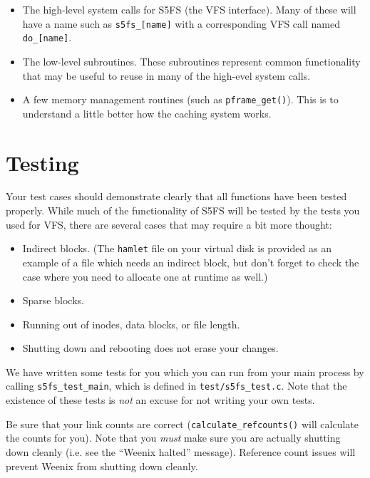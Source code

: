 \begin{itemize}

\item The high-level system calls for S5FS (the VFS interface).  Many of these will have a name such as \texttt{s5fs\_[name]} with a corresponding VFS call named \texttt{do\_[name]}.

\item The low-level subroutines.  These subroutines represent common functionality that may be useful to reuse in many of the high-evel system calls.

\item A few memory management routines (such as \texttt{pframe\_get()}).  This is to understand a little better how the caching system works.

\end{itemize}

\section{Testing}

Your test cases should demonstrate clearly that all functions have been tested properly. While much of the functionality of S5FS will be tested by the tests you used for VFS, there are several cases that may require a bit more thought:

\begin{itemize}
    \item Indirect blocks. (The \texttt{hamlet} file on your virtual disk is provided as an example of a file which needs an indirect block, but don't forget to check the case where you need to allocate one at runtime as well.)
    \item Sparse blocks.
    \item Running out of inodes, data blocks, or file length.
    \item Shutting down and rebooting does not erase your changes.
\end{itemize}

We have written some tests for you which you can run from your main process by
calling \texttt{s5fs\_test\_main}, which is defined in \texttt{test/s5fs\_test.c}. Note that the existence of these tests is \emph{not} an excuse for not writing your own tests.

Be sure that your link counts are correct (\texttt{calculate\_refcounts()} will calculate the counts for you). Note that you \emph{must} make sure you are actually shutting down cleanly (i.e. see the ``Weenix halted'' message). Reference count issues will prevent Weenix from shutting down cleanly.

